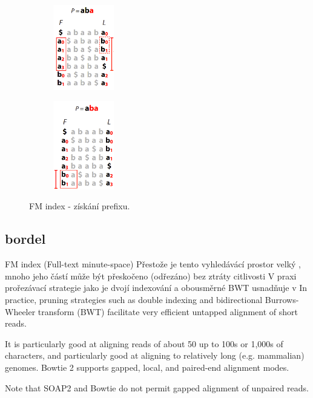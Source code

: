 \documentclass[czech,DP]{thesiskiv}
\numberwithin{equation}{section}
\begin{document}
\begin{figure}[H]
		\centering
		\begin{subfigure}[t]{.4\textwidth}
			\centering
			\includegraphics[width=100px]{./img/FM_index_1.png}
		\end{subfigure}
		\begin{subfigure}[t]{.4\textwidth}
			\centering
			\includegraphics[width=100px]{./img/FM_index_2.png}
		\end{subfigure}	
		\caption{FM index - získání prefixu. \cite{bw_transform}}
		\label{fig:fm_index}
\end{figure}







\subsection{bordel}

FM index (Full-text minute-space) 
Přestože je tento vyhledávácí prostor velký , mnoho jeho částí může být přeskočeno (odřezáno) bez ztráty citlivosti
V praxi prořezávací strategie jako je dvojí indexování a obousměrné BWT usnadňuje v In practice, pruning strategies such as double indexing and bidirectional Burrows-Wheeler transform (BWT) facilitate very efficient untapped alignment of short reads.

 It is particularly good at aligning reads of about 50 up to 100s or 1,000s of characters, and particularly good at aligning to relatively long (e.g. mammalian) genomes.
  Bowtie 2 supports gapped, local, and paired-end alignment modes.

Note that SOAP2 and Bowtie do not permit gapped alignment of unpaired reads.
\end{document}
